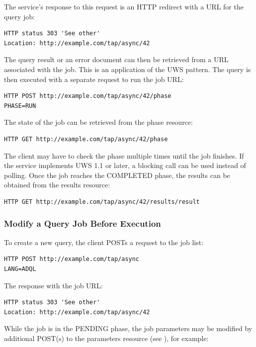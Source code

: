 \documentclass[11pt,letter]{ivoa}
\begin{document}
The service's response to this request is an HTTP redirect with a URL for the 
query job:

\begin{verbatim}
HTTP status 303 'See other'
Location: http://example.com/tap/async/42
\end{verbatim}

The query result or an error document can then be retrieved from a URL 
associated with the job. This is an application of the UWS pattern. The query is 
then executed with a separate request to run the job URL:

\begin{verbatim}
HTTP POST http://example.com/tap/async/42/phase
PHASE=RUN
\end{verbatim}

The state of the job can be retrieved from the phase resource:

\begin{verbatim}
HTTP GET http://example.com/tap/async/42/phase
\end{verbatim}

The client may have to check the phase multiple times until the job 
finishes. If the service implements UWS 1.1 \citep{std:UWS11} or later, a blocking call
can be used instead of polling. Once the job reaches the COMPLETED phase, 
the results can be obtained from the results resource:

\begin{verbatim}
HTTP GET http://example.com/tap/async/42/results/result
\end{verbatim}

\subsubsection{Modify a Query Job Before Execution}
To create a new query, the client POSTs a request to the job list:

\begin{verbatim}
HTTP POST http://example.com/tap/async
LANG=ADQL
\end{verbatim}

The response with the job URL:

\begin{verbatim}
HTTP status 303 'See other'
Location: http://example.com/tap/async/42
\end{verbatim}

While the job is in the PENDING phase, the job parameters may be modified 
by additional POST(s) to the parameters resource (see 
\citet{std:DALI11}), for example:
\end{document}
